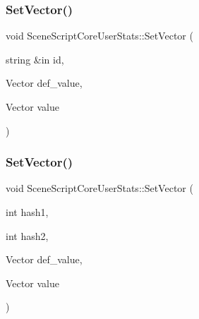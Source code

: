 \hypertarget{class_scene_script_core_user_stats_ab662b4b4c88e18bcec684bb19f2a00b0}{}\label{class_scene_script_core_user_stats_ab662b4b4c88e18bcec684bb19f2a00b0} 
\subsubsection{\texorpdfstring{Set\+Vector()}{SetVector()}\hspace{0.1cm}{\footnotesize\ttfamily [1/2]}}
{\footnotesize\ttfamily void Scene\+Script\+Core\+User\+Stats\+::\+Set\+Vector (\begin{DoxyParamCaption}\item[{string \&in}]{id,  }\item[{Vector}]{def\+\_\+value,  }\item[{Vector}]{value }\end{DoxyParamCaption})}

\hypertarget{class_scene_script_core_user_stats_ab3781d10c4efa2427cb10eb729d5eeca}{}\label{class_scene_script_core_user_stats_ab3781d10c4efa2427cb10eb729d5eeca} 
\subsubsection{\texorpdfstring{Set\+Vector()}{SetVector()}\hspace{0.1cm}{\footnotesize\ttfamily [2/2]}}
{\footnotesize\ttfamily void Scene\+Script\+Core\+User\+Stats\+::\+Set\+Vector (\begin{DoxyParamCaption}\item[{int}]{hash1,  }\item[{int}]{hash2,  }\item[{Vector}]{def\+\_\+value,  }\item[{Vector}]{value }\end{DoxyParamCaption})}

